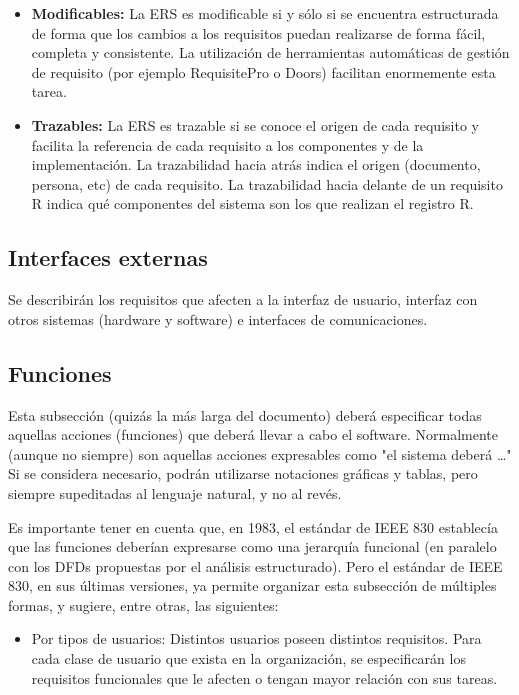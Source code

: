 \documentclass[12pt,a4paper]{article}
\begin{document}
\begin{itemize}
\begin{itemize}
\item \textbf{Modificables:} La ERS es modificable si y sólo si se encuentra
estructurada de forma que los cambios a los requisitos puedan
realizarse de forma fácil, completa y consistente. La utilización
de herramientas automáticas de gestión de requisito (por ejemplo
RequisitePro o Doors) facilitan enormemente esta tarea.

\item \textbf{Trazables:} La ERS es trazable si se conoce el origen de cada
requisito y facilita la referencia de cada requisito a los
componentes y de la implementación. La trazabilidad hacia atrás
indica el origen (documento, persona, etc) de cada requisito. La
trazabilidad hacia delante de un requisito R indica qué
componentes del sistema son los que realizan el registro R.
\end{itemize}
\end{itemize}


\subsection{Interfaces externas}
\label{sec:external_interfaces}

Se describirán los requisitos que afecten a la interfaz de usuario,
interfaz con otros sistemas (hardware y software) e interfaces de comunicaciones.


\subsection{Funciones}
\label{sec:functions}

Esta subsección (quizás la más larga del documento) deberá
especificar todas aquellas acciones (funciones) que deberá llevar a
cabo el software. Normalmente (aunque no siempre) son aquellas
acciones expresables como "el sistema deberá \ldots{}" Si se considera
necesario, podrán utilizarse notaciones gráficas y tablas, pero
siempre supeditadas al lenguaje natural, y no al revés.

Es importante tener en cuenta que, en 1983, el estándar de IEEE 830
establecía que las funciones deberían expresarse como una jerarquía
funcional (en paralelo con los DFDs propuestas por el análisis
estructurado). Pero el estándar de IEEE 830, en sus últimas
versiones, ya permite organizar esta subsección de múltiples formas,
y sugiere, entre otras, las siguientes:


\begin{itemize}
\item Por tipos de usuarios: 
    Distintos usuarios poseen distintos requisitos. Para cada clase de
usuario que exista en la organización, se especificarán los
requisitos funcionales que le afecten o tengan mayor relación con
sus tareas.
\end{itemize}
\end{document}
